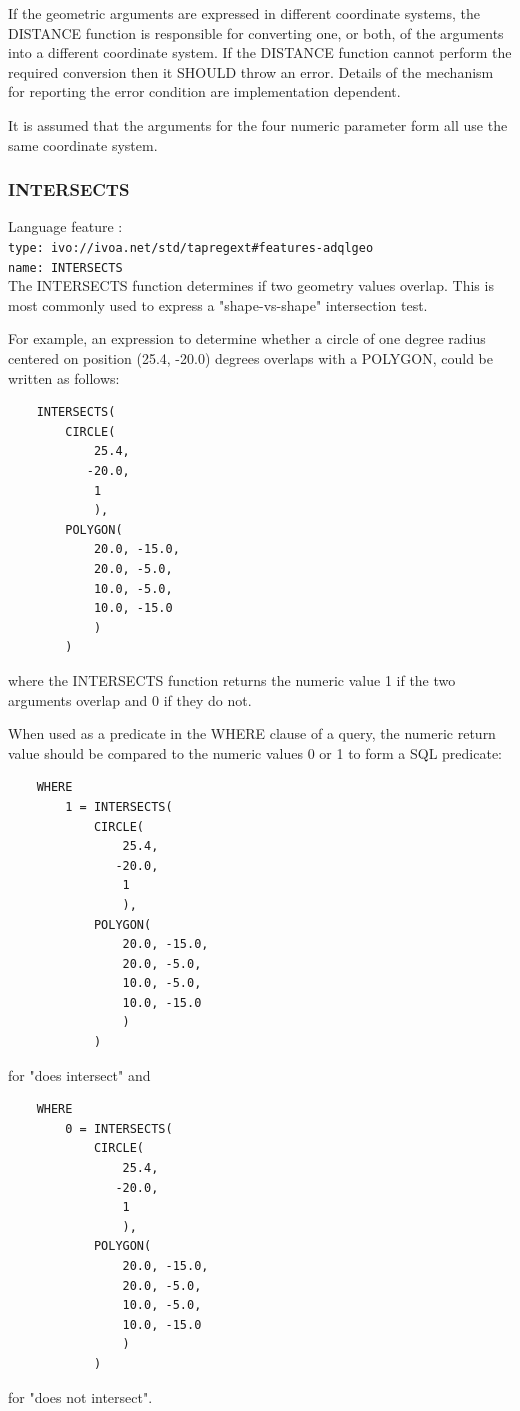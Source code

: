 \documentclass[11pt,a4paper]{ivoa}
\begin{document}
If the geometric arguments are expressed in different coordinate systems,
the DISTANCE function is responsible for converting one, or both, of the
arguments into a different coordinate system.
If the DISTANCE function cannot perform the required conversion then
it SHOULD throw an error.
Details of the mechanism for reporting the error condition are
implementation dependent.

It is assumed that the arguments for the four numeric parameter form all
use the same coordinate system.

\subsubsection{INTERSECTS}
\label{sec:functions.geom.intersects}
{\footnotesize Language feature :}\\
{\footnotesize \verb|type: ivo://ivoa.net/std/tapregext#features-adqlgeo|}\\
{\footnotesize \verb|name: INTERSECTS|}\\

The INTERSECTS function determines if two geometry values overlap. This is
most commonly used to express a "shape-vs-shape" intersection test.

For example, an expression to determine whether a circle of one degree radius
centered on position (25.4, -20.0) degrees overlaps with a POLYGON, could be
written as follows:
\begin{verbatim}
    INTERSECTS(
        CIRCLE(
            25.4,
           -20.0,
            1
            ),
        POLYGON(
            20.0, -15.0,
            20.0, -5.0,
            10.0, -5.0,
            10.0, -15.0
            )
        )
\end{verbatim}
\noindent
where the INTERSECTS function returns the numeric value 1 if the two arguments
overlap and 0 if they do not.

When used as a predicate in the WHERE clause of a query, the numeric return
value should be compared to the numeric values 0 or 1 to form a SQL predicate:
\begin{verbatim}
    WHERE
        1 = INTERSECTS(
            CIRCLE(
                25.4,
               -20.0,
                1
                ),
            POLYGON(
                20.0, -15.0,
                20.0, -5.0,
                10.0, -5.0,
                10.0, -15.0
                )
            )
\end{verbatim}
\noindent
for "does intersect" and
\begin{verbatim}
    WHERE
        0 = INTERSECTS(
            CIRCLE(
                25.4,
               -20.0,
                1
                ),
            POLYGON(
                20.0, -15.0,
                20.0, -5.0,
                10.0, -5.0,
                10.0, -15.0
                )
            )
\end{verbatim}
\noindent
for "does not intersect".
\end{document}
